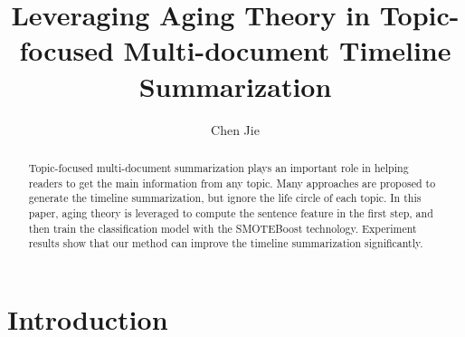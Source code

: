 \documentclass{llncs}
\begin{document}

%
\title {Leveraging  Aging Theory in Topic-focused Multi-document Timeline Summarization} 

\author{Chen Jie}

\maketitle
%
\begin{abstract}

Topic-focused multi-document summarization plays an important role in helping readers to get the main information from any topic. Many approaches are proposed to generate the timeline summarization, but ignore the life circle of each topic. In this paper, aging theory is leveraged to compute the sentence feature in the first step, and then train the classification model with the SMOTEBoost technology. %
Experiment results show that our method can improve the timeline summarization significantly.

\end{abstract}

%
\section{Introduction}
%


\end{document}
